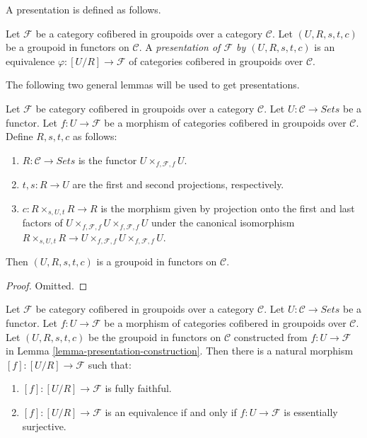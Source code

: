 \noindent
A presentation is defined as follows.

\begin{definition}
\label{definition-presentation}
Let $\mathcal{F}$ be a category cofibered in groupoids over a category
$\mathcal{C}$. Let $(U, R, s, t, c)$ be a groupoid in functors on
$\mathcal{C}$. A
{\it presentation of $\mathcal{F}$ by $(U, R, s, t, c)$} is an equivalence
$\varphi : [U/R] \to \mathcal{F}$ of categories cofibered in groupoids
over $\mathcal{C}$.
\end{definition}

\noindent
The following two general lemmas will be used to get presentations.

\begin{lemma}
\label{lemma-presentation-construction}
Let $\mathcal{F}$ be category cofibered in groupoids over a category
$\mathcal{C}$. Let $U : \mathcal{C} \to \textit{Sets}$ be a functor.
Let $f : U \to \mathcal{F}$ be a morphism of categories cofibered in groupoids
over $\mathcal{C}$. Define $R, s, t, c$ as follows:
\begin{enumerate}
\item $R : \mathcal{C} \to \textit{Sets}$ is the functor
$U \times_{f, \mathcal{F}, f} U$.
\item $t, s : R \to U$ are the first and second projections,
respectively.
\item $c : R \times_{s, U, t} R \to R$ is the morphism given by projection
onto the first and last factors of
$U \times_{f, \mathcal{F}, f} U \times_{f, \mathcal{F}, f} U$
under the canonical isomorphism
$R \times_{s, U, t} R \to
U \times_{f, \mathcal{F}, f} U \times_{f, \mathcal{F}, f} U$.
\end{enumerate}
Then $(U, R, s, t, c)$ is a groupoid in functors on $\mathcal{C}$.
\end{lemma}

\begin{proof}
Omitted.
\end{proof}

\begin{lemma}
\label{lemma-presentation-morphism}
Let $\mathcal{F}$ be category cofibered in groupoids over a category
$\mathcal{C}$. Let $U : \mathcal{C} \to \textit{Sets}$ be a functor.
Let $f : U \to \mathcal{F}$ be a morphism of categories cofibered in groupoids
over $\mathcal{C}$. Let $(U, R, s, t, c)$ be the groupoid in functors on
$\mathcal{C}$ constructed from $f : U \to \mathcal{F}$ in
Lemma \ref{lemma-presentation-construction}.
Then there is a natural morphism $[f] : [U/R] \to \mathcal{F}$ such that:
\begin{enumerate}
\item $[f]: [U/R] \to \mathcal{F}$ is fully faithful.
\item $[f]: [U/R] \to \mathcal{F}$ is an equivalence if and only if
$f : U \to \mathcal{F}$ is essentially surjective.
\end{enumerate}
\end{lemma}

